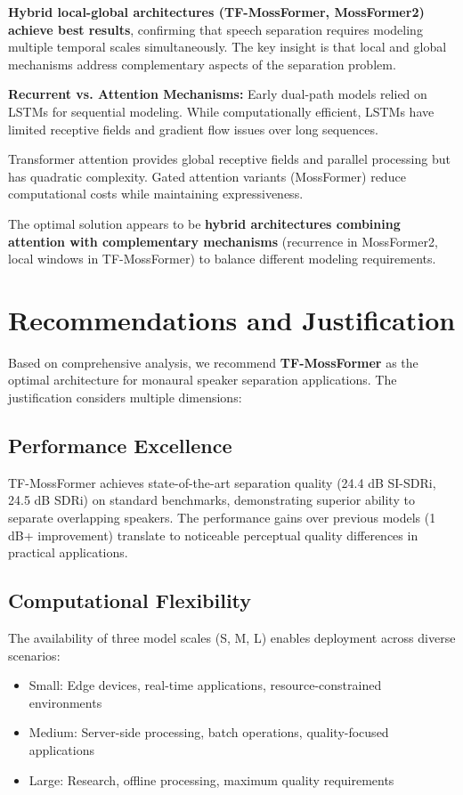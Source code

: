 \documentclass[conference]{IEEEtran}
\begin{document}
\textbf{Hybrid local-global architectures (TF-MossFormer, MossFormer2) achieve best results}, confirming that speech separation requires modeling multiple temporal scales simultaneously. The key insight is that local and global mechanisms address complementary aspects of the separation problem.

\textbf{Recurrent vs. Attention Mechanisms:} Early dual-path models relied on LSTMs for sequential modeling. While computationally efficient, LSTMs have limited receptive fields and gradient flow issues over long sequences.

Transformer attention provides global receptive fields and parallel processing but has quadratic complexity. Gated attention variants (MossFormer) reduce computational costs while maintaining expressiveness.

The optimal solution appears to be \textbf{hybrid architectures combining attention with complementary mechanisms} (recurrence in MossFormer2, local windows in TF-MossFormer) to balance different modeling requirements.

\section{Recommendations and Justification}

Based on comprehensive analysis, we recommend \textbf{TF-MossFormer} as the optimal architecture for monaural speaker separation applications. The justification considers multiple dimensions:

\subsection{Performance Excellence}

TF-MossFormer achieves state-of-the-art separation quality (24.4 dB SI-SDRi, 24.5 dB SDRi) on standard benchmarks, demonstrating superior ability to separate overlapping speakers. The performance gains over previous models (1 dB+ improvement) translate to noticeable perceptual quality differences in practical applications.

\subsection{Computational Flexibility}

The availability of three model scales (S, M, L) enables deployment across diverse scenarios:
\begin{itemize}
    \item Small: Edge devices, real-time applications, resource-constrained environments
    \item Medium: Server-side processing, batch operations, quality-focused applications
    \item Large: Research, offline processing, maximum quality requirements
\end{itemize}
\end{document}
